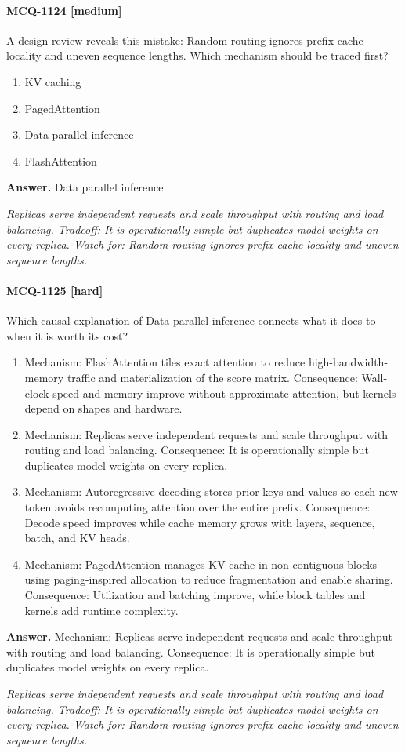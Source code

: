 \paragraph{MCQ-1124 [medium]} A design review reveals this mistake: Random routing ignores prefix-cache locality and uneven sequence lengths. Which mechanism should be traced first?
\begin{enumerate}[label=\Alph*.]
\item KV caching
\item PagedAttention
\item Data parallel inference
\item FlashAttention
\end{enumerate}
\noindent\textbf{Answer.} Data parallel inference
\par\textit{Replicas serve independent requests and scale throughput with routing and load balancing. Tradeoff: It is operationally simple but duplicates model weights on every replica. Watch for: Random routing ignores prefix-cache locality and uneven sequence lengths.}
\paragraph{MCQ-1125 [hard]} Which causal explanation of Data parallel inference connects what it does to when it is worth its cost?
\begin{enumerate}[label=\Alph*.]
\item Mechanism: FlashAttention tiles exact attention to reduce high-bandwidth-memory traffic and materialization of the score matrix. Consequence: Wall-clock speed and memory improve without approximate attention, but kernels depend on shapes and hardware.
\item Mechanism: Replicas serve independent requests and scale throughput with routing and load balancing. Consequence: It is operationally simple but duplicates model weights on every replica.
\item Mechanism: Autoregressive decoding stores prior keys and values so each new token avoids recomputing attention over the entire prefix. Consequence: Decode speed improves while cache memory grows with layers, sequence, batch, and KV heads.
\item Mechanism: PagedAttention manages KV cache in non-contiguous blocks using paging-inspired allocation to reduce fragmentation and enable sharing. Consequence: Utilization and batching improve, while block tables and kernels add runtime complexity.
\end{enumerate}
\noindent\textbf{Answer.} Mechanism: Replicas serve independent requests and scale throughput with routing and load balancing. Consequence: It is operationally simple but duplicates model weights on every replica.
\par\textit{Replicas serve independent requests and scale throughput with routing and load balancing. Tradeoff: It is operationally simple but duplicates model weights on every replica. Watch for: Random routing ignores prefix-cache locality and uneven sequence lengths.}
